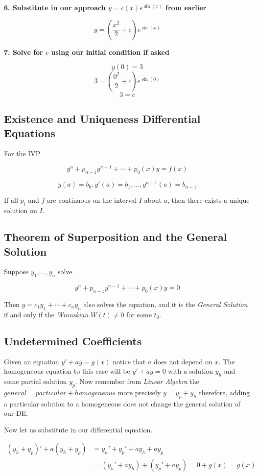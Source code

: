 \textbf{6. Substitute in our approach \(y = c(x)e^{\sin(x)}\) from earlier}

\[
    y = \left(\frac{x^2}{2} + c\right)e^{\sin(x)}
\]

\textbf{7. Solve for \(c\) using our initial condition if asked}

\[
    y(0) = 3
\]
\[
    3 = \left(\frac{0^2}{2} + c\right)e^{\sin(0)}
\]
\[
    3 = c
\]

\subsection{Existence and Uniqueness Differential Equations}

For the IVP

\[
    y^{n} + p_{n - 1}y^{n - 1}+ \cdots + p_0 (x)y = f(x)
\]

\[
    y(a) = b_0, y'(a) = b_1, \dots, y^{n - 1}(a) = b_{n - 1}
\]

If all \(p_i\) and \(f\) are continuous on the interval \(I\) about \(a\), then
there exists a unique solution on \(I\).

\subsection{Theorem of Superposition and the General Solution}

Suppose \(y_1, \dots, y_n\) solve 

\[
    y^{n} + p_{n - 1}y^{n - 1}+ \cdots + p_0 (x)y = 0
\]

Then \(y = c_1 y_1 + \cdots + c_n y_n\) also solves the equation, and it is the 
\emph{General Solution} if and only if the \emph{Wronskian} \(W(t) \ne 0\) for some \(t_0\).

\subsection{Undetermined Coefficients}

Given an equation \(y' + ay = g(x)\) notice that \(a\) does not depend on \(x\).
The homogeneous equation to this case will be \(y' + ay = 0\) with a solution \(y_h\) and some
partial solution \(y_p\). Now remember from \emph{Linear Algebra} the 
\(general = particular + homogeneous\) more precisely \(y = y_p + y_h\) therefore, adding a 
particular solution to a homogeneous does not change
the general solution of our DE.

Now let us substitute in our differential equation.

\begin{align*}
    (y_h + y_p)' + a(y_h + y_p) &= y_h' + y_p' + ay_h + ay_p\\   
    &= (y_h' + ay_h) + (y_p' + ay_p) = 0 + g(x) = g(x) 
\end{align*}

